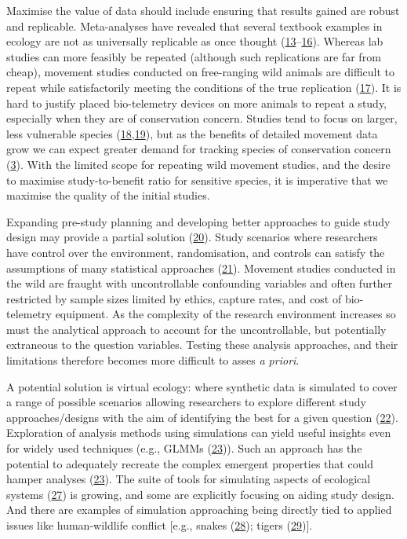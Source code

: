\documentclass[10pt,a4paper]{article}
\begin{document}
Maximise the value of data should include ensuring that results gained are robust and replicable.
Meta-analyses have revealed that several textbook examples in ecology are not as universally replicable as once thought (\protect\hyperlink{ref-clark_ocean_2020}{13}--\protect\hyperlink{ref-wang_irreproducible_2018}{16}).
Whereas lab studies can more feasibly be repeated (although such replications are far from cheap), movement studies conducted on free-ranging wild animals are difficult to repeat while satisfactorily meeting the conditions of the true replication (\protect\hyperlink{ref-fraser_role_2020}{17}).
It is hard to justify placed bio-telemetry devices on more animals to repeat a study, especially when they are of conservation concern.
Studies tend to focus on larger, less vulnerable species (\protect\hyperlink{ref-crane_lots_2021}{18},\protect\hyperlink{ref-tam_quantifying_2021}{19}), but as the benefits of detailed movement data grow we can expect greater demand for tracking species of conservation concern (\protect\hyperlink{ref-Fraser2018}{3}).
With the limited scope for repeating wild movement studies, and the desire to maximise study-to-benefit ratio for sensitive species, it is imperative that we maximise the quality of the initial studies.

Expanding pre-study planning and developing better approaches to guide study design may provide a partial solution (\protect\hyperlink{ref-williams_optimizing_2020}{20}).
Study scenarios where researchers have control over the environment, randomisation, and controls can satisfy the assumptions of many statistical approaches (\protect\hyperlink{ref-christie_simple_2019}{21}).
Movement studies conducted in the wild are fraught with uncontrollable confounding variables and often further restricted by sample sizes limited by ethics, capture rates, and cost of bio-telemetry equipment.
As the complexity of the research environment increases so must the analytical approach to account for the uncontrollable, but potentially extraneous to the question variables.
Testing these analysis approaches, and their limitations therefore becomes more difficult to asses \emph{a priori}.

A potential solution is virtual ecology: where synthetic data is simulated to cover a range of possible scenarios allowing researchers to explore different study approaches/designs with the aim of identifying the best for a given question (\protect\hyperlink{ref-gupta_reserve_2019}{22}).
Exploration of analysis methods using simulations can yield useful insights even for widely used techniques (e.g., GLMMs (\protect\hyperlink{ref-debruine_understanding_2021}{23})).
Such an approach has the potential to adequately recreate the complex emergent properties that could hamper analyses (\protect\hyperlink{ref-debruine_understanding_2021}{23}).
The suite of tools for simulating aspects of ecological systems (\protect\hyperlink{ref-guerracastro_ssp_2021}{27}) is growing, and some are explicitly focusing on aiding study design.
And there are examples of simulation approaching being directly tied to applied issues like human-wildlife conflict {[}e.g., snakes (\protect\hyperlink{ref-goldstein_integrating_2021}{28}); tigers (\protect\hyperlink{ref-Ahearn2001}{29}){]}.
\end{document}
